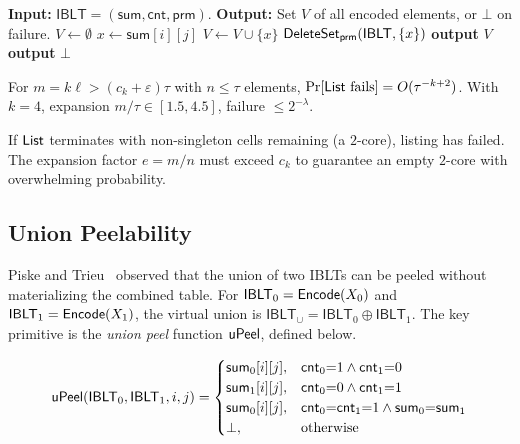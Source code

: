 \begin{algorithm}[ht]
\caption{$\List(\mathsf{IBLT})$ --- full listing (peeling).}
\label{alg:list}
\begin{algorithmic}
\STATE \textbf{Input:} $\mathsf{IBLT} = (\mathsf{sum}, \mathsf{cnt}, \mathsf{prm})$.
\STATE \textbf{Output:} Set $V$ of all encoded elements, or $\bot$ on failure.
\STATE $V \leftarrow \emptyset$
  \STATE $x \leftarrow \mathsf{sum}[i][j]$
  \STATE $V \leftarrow V \cup \{x\}$
  \STATE $\mathsf{DeleteSet}_{\mathsf{prm}}(\mathsf{IBLT}, \{x\})$
\ENDWHILE
{}
  \STATE \textbf{output} $V$
\ELSE
  \STATE \textbf{output} $\bot$
\ENDIF
\end{algorithmic}
\end{algorithm}

\begin{theorem}\label{thm:iblt}
For $m = k\ell > (c_k + \varepsilon)\tau$ with $n \leq \tau$ elements,
$\Pr[\mathsf{List}\text{ fails}] = O(\tau^{-k+2})$. With $k = 4$, expansion
$m/\tau \in [1.5, 4.5]$, failure $\leq 2^{-\lambda}$.
\end{theorem}

If $\mathsf{List}$ terminates with non-singleton cells remaining (a $2$-core),
listing has failed. The expansion factor $e = m/n$ must exceed $c_k$ to
guarantee an empty $2$-core with overwhelming probability.


\subsection{Union Peelability}

Piske and Trieu~\cite{PT26} observed that the union of two IBLTs can be peeled
without materializing the combined table. For $\mathsf{IBLT}_0 =
\mathsf{Encode}(X_0)$ and $\mathsf{IBLT}_1 = \mathsf{Encode}(X_1)$, the virtual union is
$\mathsf{IBLT}_\cup = \mathsf{IBLT}_0 \oplus \mathsf{IBLT}_1$.
The key primitive is the \emph{union peel} function $\mathsf{uPeel}$, defined below.

\begin{definition}\label{def:upeel}
\footnotesize
\[
\mathsf{uPeel}(\mathsf{IBLT}_0, \mathsf{IBLT}_1, i, j) = \begin{cases}
\mathsf{sum}_0[i][j], & \mathsf{cnt}_0{=}1 \land \mathsf{cnt}_1{=}0 \\
\mathsf{sum}_1[i][j], & \mathsf{cnt}_0{=}0 \land \mathsf{cnt}_1{=}1 \\
\mathsf{sum}_0[i][j], & \mathsf{cnt}_0{=}\mathsf{cnt}_1{=}1
                       \land \mathsf{sum}_0{=}\mathsf{sum}_1 \\
\bot, & \text{otherwise}
\end{cases}
\]
\end{definition}


